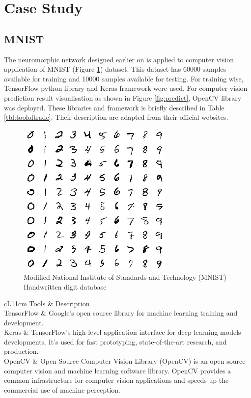 \section{Case Study}
\subsection{MNIST}
The neuromorphic network designed earlier on is applied to computer vision application of MNIST (Figure \ref{fig:mnist}) dataset. This dataset has 60000 samples available for training and 10000 samples available for testing. For training wise, TensorFlow python library and Keras framework were used. For computer vision prediction result visualisation as shown in Figure \ref{fig:predict}, OpenCV library was deployed. These libraries and framework is briefly described in Table \ref{tbl:tooloftrade}. Their description are adapted from their official websites.
\begin{figure}[H]
	\centering
	\includegraphics[scale=1]{mnist.png}
	\caption{ Modified National Institute of Standards and Technology (MNIST) Handwritten digit database}
	\label{fig:mnist}
\end{figure}
\begin{table}[ht]
	\centering
	\begin{tabular}[t]{cL{11cm}}
		\hline
		Tools & Description\\
		\hline
		\hline
		TensorFlow & Google's open source library for machine learning training and development. \cite{tensorflow}\\
		Keras & TensorFlow's high-level application interface for deep learning models developments. It's used for fast prototyping, state-of-the-art research, and production. \cite{keras}\\
		OpenCV & Open Source Computer Vision Library (OpenCV) is an open source computer vision and machine learning software library. OpenCV provides a common infrastructure for computer vision applications and speeds up the commercial use of machine perception. \cite{opencv}\\
		\hline
	\end{tabular}
	\caption{Table of tools of trade}
	\label{tbl:tooloftrade}
\end{table}
